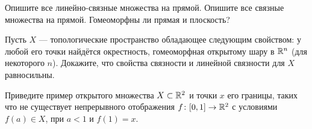 \documentclass[a4paper,12pt]{article}
\begin{document}
    Опишите все линейно-связные множества на прямой.
    Опишите все связные множества на прямой.
    Гомеоморфны ли прямая и плоскость?

    Пусть $X$ --- топологические пространство обладающее следующим свойством: у любой его точки найдётся окрестность, гомеоморфная открытому шару в $\mathbb{R}^n$ (для некоторого $n$). Докажите, что свойства связности и линейной связности для $X$ равносильны.

    Приведите пример открытого множества $X \subset \mathbb{R}^2$ и точки $x$ его границы, таких что не существует непрерывного отображения $f \colon [0,1] \rightarrow \mathbb{R}^2$ с условиями $f(a) \in X$, при $a < 1$ и $f(1) = x$.

\vfill
{}
\end{document}
